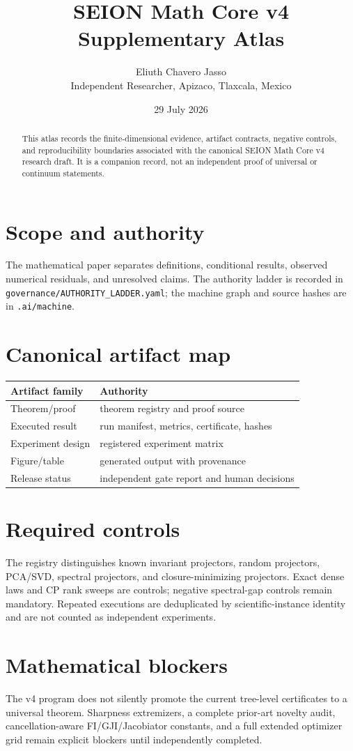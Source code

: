 \documentclass[10pt]{article}
\title{SEION Math Core v4 Supplementary Atlas}
\author{Eliuth Chavero Jasso\\Independent Researcher, Apizaco, Tlaxcala, Mexico}
\date{29 July 2026}
\begin{document}
\maketitle
\begin{abstract}This atlas records the finite-dimensional evidence, artifact contracts, negative controls, and reproducibility boundaries associated with the canonical SEION Math Core v4 research draft. It is a companion record, not an independent proof of universal or continuum statements.\end{abstract}
\section{Scope and authority}
The mathematical paper separates definitions, conditional results, observed numerical residuals, and unresolved claims. The authority ladder is recorded in \texttt{governance/AUTHORITY\_LADDER.yaml}; the machine graph and source hashes are in \texttt{.ai/machine}.
\section{Canonical artifact map}
\begin{center}\begin{tabular}{ll}\toprule
Artifact family & Authority\\\midrule
Theorem/proof & theorem registry and proof source\\
Executed result & run manifest, metrics, certificate, hashes\\
Experiment design & registered experiment matrix\\
Figure/table & generated output with provenance\\
Release status & independent gate report and human decisions\\\bottomrule
\end{tabular}\end{center}
\section{Required controls}
The registry distinguishes known invariant projectors, random projectors, PCA/SVD, spectral projectors, and closure-minimizing projectors. Exact dense laws and CP rank sweeps are controls; negative spectral-gap controls remain mandatory. Repeated executions are deduplicated by scientific-instance identity and are not counted as independent experiments.
\section{Mathematical blockers}
The v4 program does not silently promote the current tree-level certificates to a universal theorem. Sharpness extremizers, a complete prior-art novelty audit, cancellation-aware FI/GJI/Jacobiator constants, and a full extended optimizer grid remain explicit blockers until independently completed.
\end{document}
